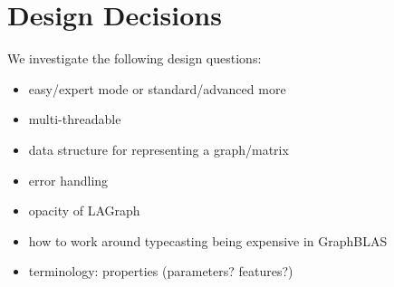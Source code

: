 \section{Design Decisions}
\label{sec:decisions}


We investigate the following design questions:

\begin{itemize}
    \item easy/expert mode or standard/advanced more
    \item multi-threadable
    \item data structure for representing a graph/matrix
    \item error handling
    \item opacity of LAGraph
    \item how to work around typecasting being expensive in GraphBLAS
    \item terminology: properties (parameters? features?)
\end{itemize}
